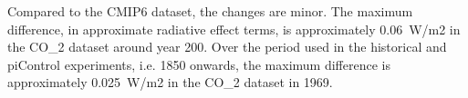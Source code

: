 Compared to the CMIP6 dataset, the changes are minor.
The maximum difference, in approximate radiative effect terms, is approximately 0.06~W/m2 in the CO_2 dataset around year 200.
Over the period used in the historical and piControl experiments, i.e. 1850 onwards,
the maximum difference is approximately 0.025~W/m2 in the CO_2 dataset in 1969.

